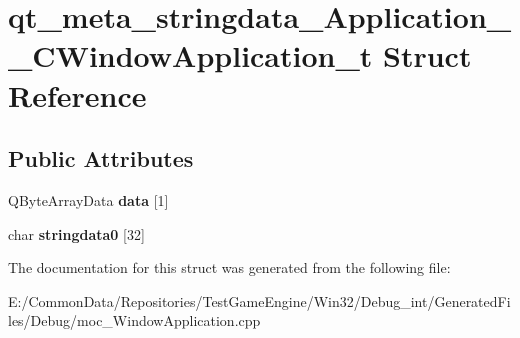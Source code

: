 \hypertarget{structqt__meta__stringdata___application_____c_window_application__t}{}\section{qt\+\_\+meta\+\_\+stringdata\+\_\+\+Application\+\_\+\+\_\+\+C\+Window\+Application\+\_\+t Struct Reference}
\label{structqt__meta__stringdata___application_____c_window_application__t}
\subsection*{Public Attributes}
\begin{DoxyCompactItemize}
\item 
\mbox{\label{structqt__meta__stringdata___application_____c_window_application__t_a581ab2cb261ce617c38896695a3299ca}} 
Q\+Byte\+Array\+Data {\bfseries data} \mbox{[}1\mbox{]}
\item 
\mbox{\label{structqt__meta__stringdata___application_____c_window_application__t_ae0184cf30df8d38e36ff8e9478c12aef}} 
char {\bfseries stringdata0} \mbox{[}32\mbox{]}
\end{DoxyCompactItemize}


The documentation for this struct was generated from the following file\+:\begin{DoxyCompactItemize}
\item 
E\+:/\+Common\+Data/\+Repositories/\+Test\+Game\+Engine/\+Win32/\+Debug\+\_\+int/\+Generated\+Files/\+Debug/moc\+\_\+\+Window\+Application.\+cpp\end{DoxyCompactItemize}
